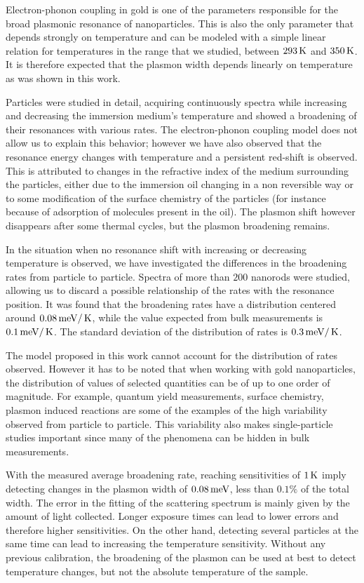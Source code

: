 Electron-phonon coupling in gold is one of the parameters responsible for the
broad plasmonic resonance of nanoparticles. This is also the only parameter that
depends strongly on temperature and can be modeled with a simple linear relation
for temperatures in the range that we studied, between $293\,\textrm{K}$ and $350\,\textrm{K}$. It
is therefore expected that the plasmon width depends linearly on temperature as
was shown in this work.

Particles were studied in detail, acquiring continuously spectra while
increasing and decreasing the immersion medium's temperature and showed a
broadening of their resonances with various rates. The electron-phonon coupling
model does not allow us to explain this behavior; however we have also observed
that the resonance energy changes with temperature and a persistent red-shift is
observed. This is attributed to changes in the refractive index of the medium
surrounding the particles, either due to the immersion oil changing in a non
reversible way or to some modification of the surface chemistry of the particles
(for instance because of adsorption of molecules present in the oil). The
plasmon shift however disappears after some thermal cycles, but the plasmon
broadening remains.

In the situation when no resonance shift with increasing or decreasing
temperature is observed, we have investigated the differences in the broadening
rates from particle to particle. Spectra of more than $200$ nanorods were
studied, allowing us to discard a possible relationship of the rates with the
resonance position. It was found that the broadening rates have a distribution
centered around $0.08\,\textrm{meV}/\,\textrm{K}$, while the value expected from bulk measurements
is $0.1\,\textrm{meV}/\,\textrm{K}$\cite{McKay1976}. The standard deviation of the distribution of
rates is $0.3\,\textrm{meV}/\,\textrm{K}$.

The model proposed in this work cannot account for the distribution of rates
observed. However it has to be noted that when working with gold nanoparticles,
the distribution of values of selected quantities can be of up to one order of
magnitude. For example, quantum yield measurements\cite{Yorulmaz2012}, surface
chemistry\cite{Carattino2016}, plasmon induced reactions\cite{Osinkina2013} are
some of the examples of the high variability observed from particle to particle.
This variability also makes single-particle studies important since many of the
phenomena can be hidden in bulk measurements\cite{Link1999b}.

With the measured average broadening rate, reaching sensitivities of $1\,\textrm{K}$ imply
detecting changes in the plasmon width of $0.08\,\textrm{meV}$, less than $0.1\%$ of the
total width. The error in the fitting of the scattering spectrum is mainly given
by the amount of light collected. Longer exposure times can lead to lower errors
and therefore higher sensitivities. On the other hand, detecting several
particles at the same time can lead to increasing the temperature sensitivity.
Without any previous calibration, the broadening of the plasmon can be used at
best to detect temperature changes, but not the absolute temperature of the
sample.

